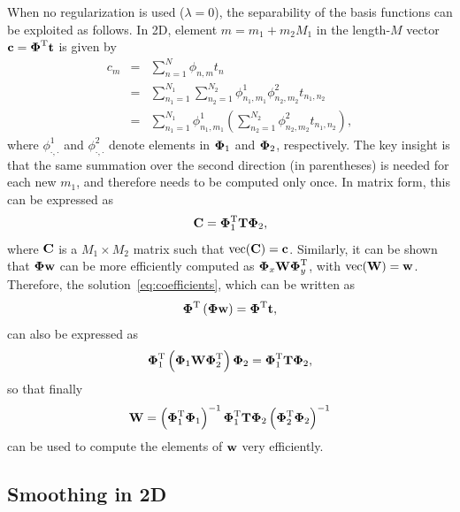 \documentclass[10pt,twoside]{book}
\begin{document}
When no regularization is used ($\lambda = 0$), 
the separability of the basis functions can be exploited
as follows.
%
%
In 2D, element $m=m_1 + m_2 M_1$ in the length-$M$ vector $\mathbf{c} = {\mbox{\boldmath {${\Phi}$}}}^\mathrm{T} \mathbf{t}$ is given by
\begin{eqnarray*}
c_m 
& = &
\sum_{n=1}^{N} \phi_{n,m} t_n 
\\
& = & 
\sum_{n_1=1}^{N_1}
\sum_{n_2=1}^{N_2}
\phi_{n_1,m_1}^1 
\phi_{n_2,m_2}^2 
t_{n_1,n_2}
\\
& = & 
\sum_{n_1=1}^{N_1}
\phi_{n_1,m_1}^1 
\left(
\sum_{n_2=1}^{N_2}
\phi_{n_2,m_2}^2 
t_{n_1,n_2}
\right)
,
\end{eqnarray*}
where 
$\phi_{\cdot,\cdot}^1$ and 
$\phi_{\cdot,\cdot}^2$ denote elements in ${\mbox{\boldmath {${\Phi}$}}}_1$ and ${\mbox{\boldmath {${\Phi}$}}}_2$, respectively.
The key insight is that the same summation over the second direction (in parentheses) is needed for each 
new $m_1$,
and therefore needs to be computed only once. In matrix form, this can be expressed as 
$$
\mathbf{C} = {\mbox{\boldmath {${\Phi}$}}}_1^\mathrm{T} \mathbf{T} {\mbox{\boldmath {${\Phi}$}}}_2,
$$
where $\mathbf{C}$ is a $M_1 \times M_2$ matrix such that $\mathrm{vec}( \mathbf{C} ) = \mathbf{c}$.
Similarly, it can be shown that ${\mbox{\boldmath {${\Phi}$}}} \mathbf{w}$ can be more efficiently computed as ${\mbox{\boldmath {${\Phi}$}}}_x \mathbf{W} {\mbox{\boldmath {${\Phi}$}}}_y^\mathrm{T}$, with $\mathrm{vec}( \mathbf{W} ) = \mathbf{w}$.
Therefore, the solution~\eqref{eq:coefficients}, which can be written as
$$
{\mbox{\boldmath {${\Phi}$}}}^\mathrm{T} 
\left(
{\mbox{\boldmath {${\Phi}$}}}
\mathbf{w}
\right)
=
{\mbox{\boldmath {${\Phi}$}}}^\mathrm{T} \mathbf{t}
,
$$
can also be expressed as 
$$
{\mbox{\boldmath {${\Phi}$}}}_1^\mathrm{T}
\left(
{\mbox{\boldmath {${\Phi}$}}}_1\mathbf{W}{\mbox{\boldmath {${\Phi}$}}}_2^\mathrm{T} 
\right)
{\mbox{\boldmath {${\Phi}$}}}_2
=
{\mbox{\boldmath {${\Phi}$}}}_1^\mathrm{T}
\mathbf{T}
{\mbox{\boldmath {${\Phi}$}}}_2
,
$$
so that finally 
\begin{equation}
\mathbf{W} = 
\left( 
{\mbox{\boldmath {${\Phi}$}}}_1^\mathrm{T}
{\mbox{\boldmath {${\Phi}$}}}_1
\right)^{-1}
{\mbox{\boldmath {${\Phi}$}}}_1^\mathrm{T}
\mathbf{T}
{\mbox{\boldmath {${\Phi}$}}}_2
\left( 
{\mbox{\boldmath {${\Phi}$}}}_2^\mathrm{T}
{\mbox{\boldmath {${\Phi}$}}}_2
\right)^{-1}
\label{eq:solution2D}
\end{equation}
can be used to compute the elements of $\mathbf{w}$ very efficiently.


\subsection{Smoothing in 2D}
\end{document}
